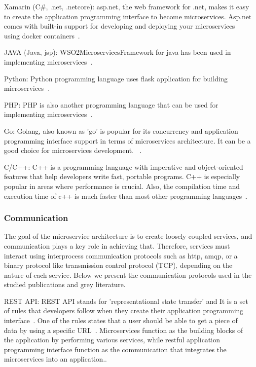 \par Xamarin (C\#, .net, .netcore): asp.net, the web framework for .net, makes it easy to create the application programming interface to become microservices. Asp.net comes with built-in support for developing and deploying your microservices using docker containers~\cite{liu2018, chauvel2018, haugeland2020, Johansson2019, neves2019, Falatiuk2019}.

\par JAVA (Java, jsp): WSO2MicroservicesFramework for java has been used in implementing microservices~\cite{Sharaf2019, khan2020, KalskeM2017, Venugopal2017}.

\par Python: Python programming language uses flask application for building microservices~\cite{Ghebremicael2017, khan2020, Hou2020}.

\par PHP: PHP is also another programming language that can be used for implementing microservices~\cite{McElhiney2018}.

\par Go: Golang, also known as 'go' is popular for its concurrency and application programming interface support in terms of microservices architecture. It can be a good choice for microservices development. ~\cite{liu2018}.

\par C/C++: C++ is a programming language with imperative and object-oriented features that help developers write fast, portable programs. C++ is especially popular in areas where performance is crucial. Also, the compilation time and execution time of c++ is much faster than most other programming languages~\cite{Ghebremicael2017}. 


\subsubsection{Communication}

The goal of the microservice architecture is to create loosely coupled services, and communication plays a key role in achieving that. Therefore, services must interact using interprocess communication protocols such as http, amqp, or a binary protocol like transmission control protocol (TCP), depending on the nature of each service. Below we present the communication protocols used in the studied publications and grey literature.

\par REST API: REST API stands for 'representational state transfer' and It is a set of rules that developers follow when they create their application programming interface~\cite{Ndungu2019, Zhang2019}. One of the rules states that a user should be able to get a piece of data by using a specific URL~\cite{Koschel2017, Branko2018}. Microservices function as the building blocks of the application by performing various services, while restful application programming interface function as the communication that integrates the microservices into an application.\cite{liu2018, Zaytev2018, chauvel2018, Johansson2019}.

